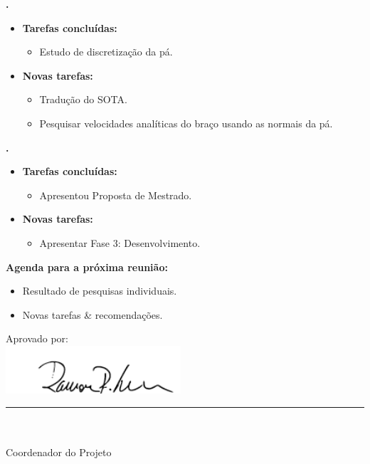 	  \textbf{\renan.} 
	\begin{itemize}
		\item \textbf{Tarefas concluídas:}
			\begin{itemize}    
				\item Estudo de discretização da pá.
			\end{itemize}
		
		\item \textbf{Novas tarefas:}
			\begin{itemize} 
			    \item Tradução do SOTA.
			    \item Pesquisar velocidades analíticas do braço usando as normais da pá.
			\end{itemize}
	\end{itemize}	
	
		
			
   \textbf{\julia.} 
	\begin{itemize}
		\item \textbf{Tarefas concluídas:}
			\begin{itemize}    
				\item Apresentou Proposta de Mestrado.
			\end{itemize}
		
		\item \textbf{Novas tarefas:}
			\begin{itemize} 
			    \item Apresentar Fase 3: Desenvolvimento. 
			\end{itemize}
	\end{itemize}		



\textbf{Agenda para a próxima reunião:}
  \begin{itemize}
    \item Resultado de pesquisas individuais.
    \item Novas tarefas \& recomendações.
  \end{itemize}


\vspace{5mm}%
\parbox[t]{70mm}{
  Aprovado por: \\[5mm]
  \centering
  \includegraphics[width=65mm]{figs/logo/assinatura-ramon.png} \\[-4mm]
  \rule[2mm]{70mm}{0.1mm} \\
  \ramon \\[1mm]
  Coordenador do Projeto \\
}

\fim